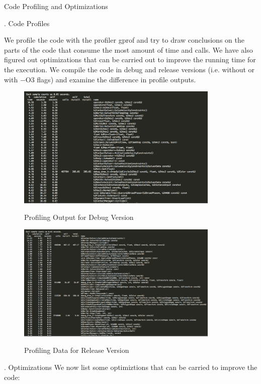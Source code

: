 \documentclass[a4paper,11pt]{resume}
\begin{document}
\begin{rSection}{{\heading Code Profiling and Optimizations}}
\begin{rSubsection}{{. Code Profiles}}{}{}{}

We profile the code with the profiler gprof and try to draw conclusions on the parts of the code that consume the most amount of time and calls. We have also figured out optimizations that can be carried out to improve the running time for the execution. We compile the code in debug and release versions (i.e. without or with −O3 flags) and examine the difference in profile outputs.
\begin{figure}[h]
\centering
\includegraphics[width=0.86\textwidth]{debug}
\label{fig:init}
\caption{Profiling Output for Debug Version}
\end{figure}
\begin{figure}[h]
\centering
\includegraphics[width=0.86\textwidth]{release}
\label{fig:init}
\caption{Profiling Data for Release Version}
\end{figure}
\end{rSubsection}
\newpage
\begin{rSubsection}{{. Optimizations}}{}{}{}
We now list some optimiztions that can be carried to improve the code:

\end{rSubsection}
\end{rSection}
\end{document}
